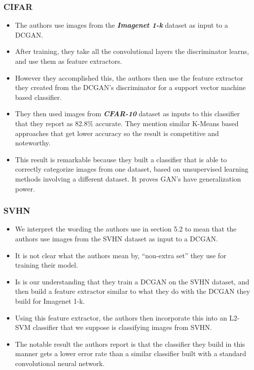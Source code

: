 \documentclass{beamer}
\begin{document}
\begin{frame}
\frametitle{CIFAR}
\begin{itemize}
 \item The authors use images from the \textbf{\textit{Imagenet 1-k}} dataset as input to a DCGAN.
 \item After training, they take all the convolutional layers the discriminator
 learns, and use them as feature extractors. 
 
\item However they accomplished this, the authors then use the feature extractor 
  they created from the DCGAN's discriminator for a support vector machine based
  classifier.
\item They then used images from \textbf{\textit{CFAR-10}} dataset as inputs to this
  classifier that they report as 82.8\% accurate. They mention similar K-Means based
  approaches that get lower accuracy so the result is competitive and noteworthy.
 
\item This result is remarkable because they built a classifier that is able to
  correctly categorize images from one dataset, based on unsupervised learning
  methods involving a different dataset.  It proves GAN's have generalization power.


\end{itemize}
\end{frame}


\begin{frame}
\frametitle{SVHN}
\begin{itemize}
 \item We interpret the wording the authors use in section 5.2 to mean that the
   authors use images from the SVHN dataset as input to a DCGAN.
 \item It is not clear what the authors mean by, ``non-extra set'' they use 
  for training their model.
 \item Is is our understanding that they train a DCGAN on the SVHN dataset, and
  then build a feature extractor similar to what they do with the DCGAN they
  build for Imagenet 1-k.
\item Using this feature extractor, the authors then incorporate this into an
  L2-SVM classifier that we suppose is classifying images from SVHN.
\item The notable result the authors report is that the classifier they build in
  this manner gets a lower error rate than a similar classifier built with a
  standard convolutional neural network.

\end{itemize}
\end{frame}
\end{document}
